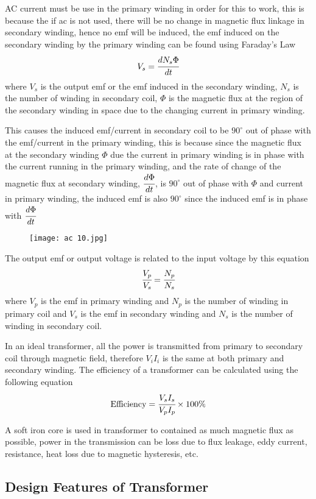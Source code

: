 \documentclass{article}
\begin{document}
AC current must be use in the primary winding in order for this to work, this is because the if ac is not used, there will be no change in magnetic flux linkage in secondary winding, hence no emf will be induced, the emf induced on the secondary winding by the primary winding can be found using Faraday's Law
$$V_s=\cfrac{dN_s\Phi}{dt}$$
where $V_s$ is the output emf or the emf induced in the secondary winding, $N_s$ is the number of winding in secondary coil, $\Phi$ is the magnetic flux at the region of the secondary winding in space due to the changing current in primary winding.

This causes the induced emf/current in secondary coil to be $90^{\circ}$ out of phase with the emf/current in the primary winding, this is because since the magnetic flux at the secondary winding $\Phi$ due the current in primary winding is in phase with the current running in the primary winding, and the rate of change of the magnetic flux at secondary winding, $\cfrac{d\Phi}{dt}$, is $90^{\circ}$ out of phase with $\Phi$ and current in primary winding, the induced emf is also $90^{\circ}$ since the induced emf is in phase with $\cfrac{d\Phi}{dt}$
\begin{figure}[H]
    \centering
    \texttt{[image: ac 10.jpg]}
\end{figure}

The output emf or output voltage is related to the input voltage by this equation 
$$\cfrac{V_p}{V_s}=\cfrac{N_p}{N_s}$$
where $V_p$ is the emf in primary winding and $N_p$ is the number of winding in primary coil and $V_s$ is the emf in secondary winding and $N_s$ is the number of winding in secondary coil.

In an ideal transformer, all the power is transmitted from primary to secondary coil through magnetic field, therefore $V_iI_i$ is the same at both primary and secondary winding. The efficiency of a transformer can be calculated using the following equation
$$\text{Efficiency}=\cfrac{V_sI_s}{V_pI_p}\times 100\%$$

A soft iron core is used in transformer to contained as much magnetic flux as possible, power in the transmission can be loss due to flux leakage, eddy current, resistance, heat loss due to magnetic hysteresis, etc.


\subsection{Design Features of Transformer}
\end{document}
